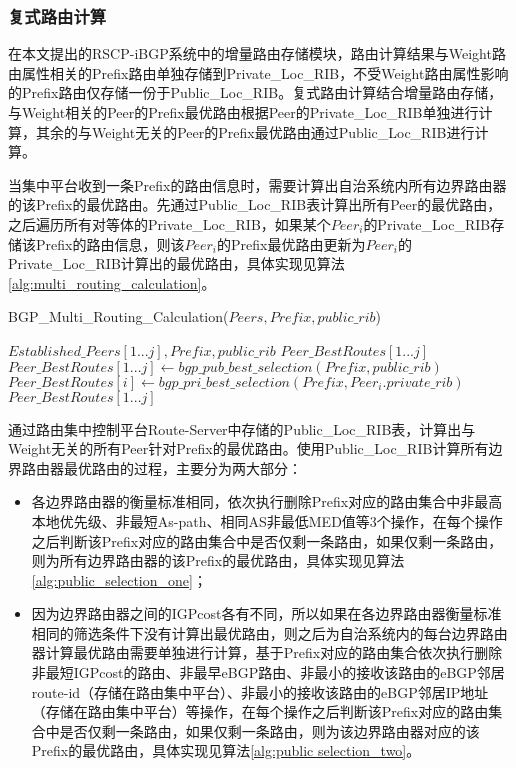\subsubsection{复式路由计算}


在本文提出的RSCP-iBGP系统中的增量路由存储模块，路由计算结果与Weight路由属性相关的Prefix路由单独存储到Private\_Loc\_RIB，不受Weight路由属性影响的Prefix路由仅存储一份于Public\_Loc\_RIB。复式路由计算结合增量路由存储，与Weight相关的Peer的Prefix最优路由根据Peer的Private\_Loc\_RIB单独进行计算，其余的与Weight无关的Peer的Prefix最优路由通过Public\_Loc\_RIB进行计算。

当集中平台收到一条Prefix的路由信息时，需要计算出自治系统内所有边界路由器的该Prefix的最优路由。先通过Public\_Loc\_RIB表计算出所有Peer的最优路由，之后遍历所有对等体的Private\_Loc\_RIB，如果某个$Peer_i$的Private\_Loc\_RIB存储该Prefix的路由信息，则该$Peer_i$的Prefix最优路由更新为$Peer_i$的Private\_Loc\_RIB计算出的最优路由，具体实现见算法\ref{alg:multi_routing_calculation}。

\begin{algorithm}[htb]
    \caption{BGP\_Multi\_Routing\_Calculation($Peers, Prefix, public\_rib$)}%
    \label{alg:multi_routing_calculation}
    \begin{algorithmic}[1]%
        \REQUIRE
        $Established\_Peers[1...j], Prefix, public\_rib$
        \ENSURE
        $Peer\_BestRoutes[1...j]$
        \STATE $Peer\_BestRoutes[1...j] \gets  bgp\_pub\_best\_selection(Prefix, public\_rib)$
        \STATE $Peer\_BestRoutes[i] \gets  bgp\_pri\_best\_selection(Prefix, Peer_i.private\_rib)$
        \ENDIF
        \ENDFOR
        \RETURN $Peer\_BestRoutes[1...j]$
    \end{algorithmic}
\end{algorithm}

通过路由集中控制平台Route-Server中存储的Public\_Loc\_RIB表，计算出与Weight无关的所有Peer针对Prefix的最优路由。使用Public\_Loc\_RIB计算所有边界路由器最优路由的过程，主要分为两大部分：
\begin{itemize}
  \item 各边界路由器的衡量标准相同，依次执行删除Prefix对应的路由集合中非最高本地优先级、非最短As-path、相同AS非最低MED值等3个操作，在每个操作之后判断该Prefix对应的路由集合中是否仅剩一条路由，如果仅剩一条路由，则为所有边界路由器的该Prefix的最优路由，具体实现见算法\ref{alg:public_selection_one}；
  \item 因为边界路由器之间的IGPcost各有不同，所以如果在各边界路由器衡量标准相同的筛选条件下没有计算出最优路由，则之后为自治系统内的每台边界路由器计算最优路由需要单独进行计算，基于Prefix对应的路由集合依次执行删除非最短IGPcost的路由、非最早eBGP路由、非最小的接收该路由的eBGP邻居route-id（存储在路由集中平台）、非最小的接收该路由的eBGP邻居IP地址（存储在路由集中平台）等操作，在每个操作之后判断该Prefix对应的路由集合中是否仅剩一条路由，如果仅剩一条路由，则为该边界路由器对应的该Prefix的最优路由，具体实现见算法\ref{alg:public selection_two}。
\end{itemize}


